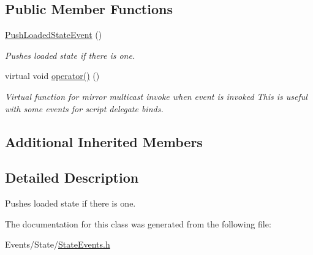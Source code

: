 \subsection*{Public Member Functions}
\begin{DoxyCompactItemize}
\item 
\mbox{\label{classPushLoadedStateEvent_a973348cd6a0ef500a0ebfac8a5bd6ffa}} 
\hyperlink{classPushLoadedStateEvent_a973348cd6a0ef500a0ebfac8a5bd6ffa}{Push\+Loaded\+State\+Event} ()
\begin{DoxyCompactList}\small\item\em Pushes loaded state if there is one. \end{DoxyCompactList}\item 
\mbox{\label{classPushLoadedStateEvent_a3a2ba2472d85b6e0a2980fe447986e69}} 
virtual void \hyperlink{classPushLoadedStateEvent_a3a2ba2472d85b6e0a2980fe447986e69}{operator()} ()
\begin{DoxyCompactList}\small\item\em Virtual function for mirror multicast invoke when event is invoked This is useful with some events for script delegate binds. \end{DoxyCompactList}\end{DoxyCompactItemize}
\subsection*{Additional Inherited Members}


\subsection{Detailed Description}
Pushes loaded state if there is one. 

The documentation for this class was generated from the following file\+:\begin{DoxyCompactItemize}
\item 
Events/\+State/\hyperlink{StateEvents_8h}{State\+Events.\+h}\end{DoxyCompactItemize}
